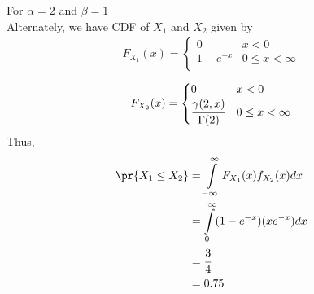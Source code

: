 For $\alpha=2$ and $\beta=1$\\
Alternately, we have CDF of $X_1$ and $X_2$ given by 
\begin{align}
    F_{X_1}(x) = 
    \begin{cases}
     0   & x < 0\\
    1-e^{-x} & 0\le x < \infty\\
    \end{cases}
\end{align}
\begin{align}
    F_{X_2}(x) = 
    \begin{cases}
    0   & x < 0\\
    \cfrac{\gamma(2,x)}{\Gamma(2)} & 0\le x < \infty\\
    \end{cases}
\end{align}
Thus, 
\begin{align}
    \pr{X_1\le X_2}&=\displaystyle\int\limits_{-\infty}^{\infty} F_{X_1}(x)f_{X_2}(x)dx\\
                &= \displaystyle\int\limits_0^\infty(1-e^{-x})(xe^{-x})dx\\
                &= \cfrac{3}{4}\\
                &= 0.75
\end{align}
